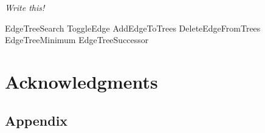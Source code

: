 \documentclass[article]{jss}
\begin{document}
{\em Write this!}


EdgeTreeSearch
ToggleEdge
AddEdgeToTrees
DeleteEdgeFromTrees
EdgeTreeMinimum
EdgeTreeSuccessor





\section*{Acknowledgments}





\newpage

\begin{appendix}


\section[appendix]{Appendix}
\label{appendix}

\end{appendix}
\end{document}
